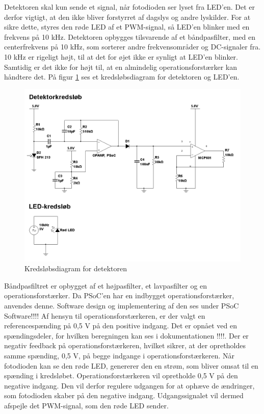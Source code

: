 Detektoren skal kun sende et signal, når fotodioden ser lyset fra LED'en. Det er derfor vigtigt, at den ikke bliver forstyrret af dagslys og andre lyskilder. For at sikre dette, styres den røde LED af et PWM-signal, så LED'en blinker med en frekvens på 10 kHz. Detektoren opbygges tilsvarende af et båndpasfilter, med en centerfrekvens på 10 kHz, som sorterer andre frekvensområder og DC-signaler fra. 10 kHz er rigeligt højt, til at det for øjet ikke er synligt at LED'en blinker. Samtidig er det ikke for højt til, at en almindelig operationsforstærker kan håndtere det. På figur \ref*{fig:detektortand} ses et kredsløbsdiagram for detektoren og LED'en.

\begin{figure}[H]
	\centering
	\includegraphics[width=\textwidth]{Afsnit/DesignOgImplementering/images/detektor_tandhjul}
	\caption{Kredsløbsdiagram for detektoren}
	\label{fig:detektortand}
\end{figure}

Båndpasfiltret er opbygget af et højpasfilter, et lavpasfilter og en operationsforstærker. Da PSoC'en har en indbygget operationsforstærker, anvendes denne. Software design og implementering af den ses under PSoC Software!!!! Af hensyn til operationsforstærkeren, er der valgt en referencespænding på 0,5 V på den positive indgang. Det er opnået ved en spændingsdeler, for hvilken beregningen kan ses i dokumentationen !!!!. Der er negativ feedback på operationsforstærkeren, hvilket sikrer, at der opretholdes samme spænding, 0,5 V, på begge indgange i operationsforstærkeren. Når fotodioden kan se den røde LED, genererer den en strøm, som bliver omsat til en spænding i kredsløbet. Operationsforstærkeren vil opretholde 0,5 V på den negative indgang. Den vil derfor regulere udgangen for at ophæve de ændringer, som fotodioden skaber på den negative indgang. Udgangssignalet vil dermed afspejle det PWM-signal, som den røde LED sender.  

